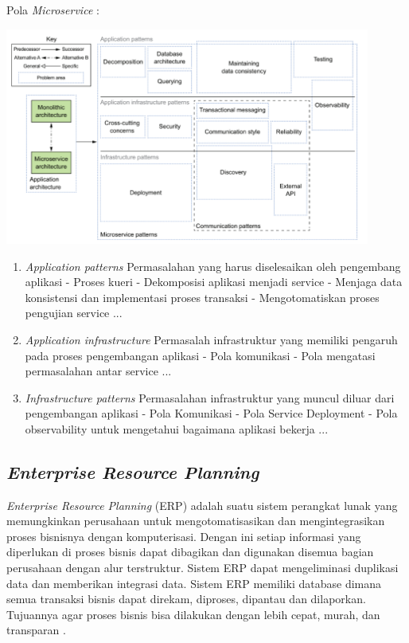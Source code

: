 Pola \textit{Microservice}  \cite{8}:
\begin{center}
	\includegraphics[width=12cm]{img/PolaMicroservice.png}
	\label{fig:msa}
\end{center}
\begin{enumerate}[leftmargin=1.3cm]
	\item \textit{Application patterns}
	Permasalahan yang harus diselesaikan oleh pengembang aplikasi
	- Proses kueri
	- Dekomposisi aplikasi menjadi service
	- Menjaga data konsistensi dan implementasi proses transaksi
	- Mengotomatiskan proses pengujian  service ...
	\item \textit{Application infrastructure} 
	Permasalah infrastruktur yang memiliki pengaruh pada proses pengembangan aplikasi
	- Pola komunikasi
	- Pola mengatasi permasalahan antar service ...
	\item \textit{Infrastructure patterns} 
	Permasalahan infrastruktur yang muncul diluar dari pengembangan aplikasi
	- Pola Komunikasi
	- Pola Service Deployment
	- Pola observability untuk mengetahui bagaimana aplikasi bekerja ...\\	
\end{enumerate}	

\subsection{\textit{Enterprise Resource Planning}}
\textit{Enterprise Resource Planning} (ERP) adalah suatu sistem perangkat lunak yang memungkinkan perusahaan untuk mengotomatisasikan dan mengintegrasikan proses bisnisnya dengan komputerisasi. Dengan ini setiap informasi yang diperlukan di proses bisnis dapat dibagikan dan digunakan disemua bagian perusahaan dengan alur terstruktur. Sistem ERP dapat mengeliminasi duplikasi data dan memberikan integrasi data. Sistem ERP memiliki database dimana semua transaksi bisnis dapat direkam, diproses, dipantau dan dilaporkan. Tujuannya agar proses bisnis bisa dilakukan dengan lebih cepat, murah, dan transparan \cite{1}.

